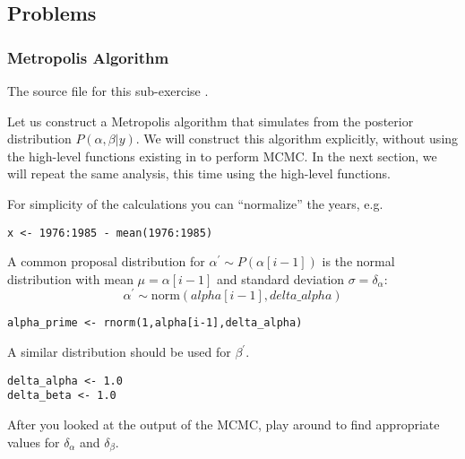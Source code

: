\subsection{Problems}

\subsubsection{Metropolis Algorithm}%

The source file for this sub-exercise .

Let us construct a Metropolis algorithm that simulates from the posterior distribution $P(\alpha,\beta|y)$. 
We will construct this algorithm explicitly, without using the high-level functions existing in \RevBayes  to perform MCMC. 
In the next section, we will repeat the same analysis, this time using the high-level functions.
 
For simplicity of the calculations you can ``normalize'' the years, e.g. 
{\tt \begin{snugshade*}
\begin{lstlisting}    
x <- 1976:1985 - mean(1976:1985)
\end{lstlisting}
\end{snugshade*}}

A common proposal distribution for $\alpha^{\prime} \sim P(\alpha[i-1])$ is the normal distribution with mean $\mu = \alpha[i-1]$ and standard deviation $\sigma = \delta_\alpha$:
\begin{equation}
\alpha^{\prime} \sim \text{norm}(alpha[i-1],delta\_alpha)
\end{equation}

{\tt \begin{snugshade*}
\begin{lstlisting}    
alpha_prime <- rnorm(1,alpha[i-1],delta_alpha)
\end{lstlisting}
\end{snugshade*}}
A similar distribution should be used for $\beta^{\prime}$. 
{\tt \begin{snugshade*}
\begin{lstlisting}    
delta_alpha <- 1.0
delta_beta <- 1.0
\end{lstlisting}
\end{snugshade*}}
After you looked at the output of the MCMC, play around to find appropriate values for $\delta_{\alpha}$ and $\delta_{\beta}$.

